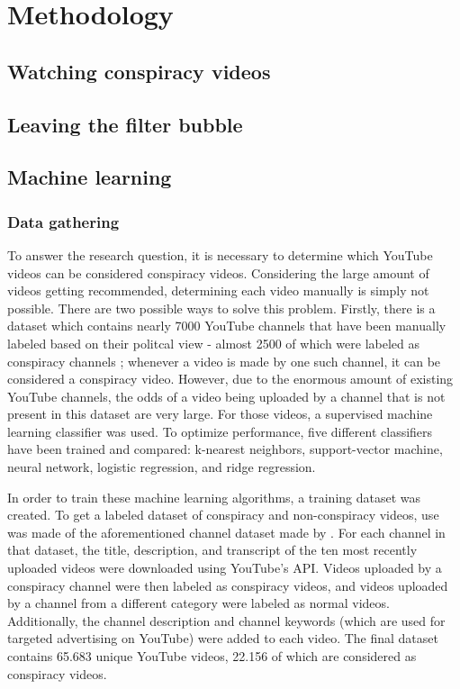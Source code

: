 \documentclass[../main.tex]{subfiles}
\begin{document}
\section{Methodology}
\subsection{Watching conspiracy videos}

\subsection{Leaving the filter bubble}

\subsection{Machine learning}
\subsubsection{Data gathering}
To answer the research question, it is necessary to determine which YouTube videos can be considered conspiracy videos. Considering the large amount of videos getting recommended, determining each video manually is simply not possible. There are two possible ways to solve this problem. Firstly, there is a dataset which contains nearly 7000 YouTube channels that have been manually labeled based on their politcal view - almost 2500 of which were labeled as conspiracy channels \citep{ledwich2019algorithmic}; whenever a video is made by one such channel, it can be considered a conspiracy video. However, due to the enormous amount of existing YouTube channels, the odds of a video being uploaded by a channel that is not present in this dataset are very large. For those videos, a supervised machine learning classifier was used. To optimize performance, five different classifiers have been trained and compared: k-nearest neighbors, support-vector machine, neural network, logistic regression, and ridge regression. 

In order to train these machine learning algorithms, a training dataset was created. To get a labeled dataset of conspiracy and non-conspiracy videos, use was made of the aforementioned channel dataset made by \citet{ledwich2019algorithmic}. For each channel in that dataset, the title, description, and transcript of the ten most recently uploaded videos were downloaded using YouTube's API. Videos uploaded by a conspiracy channel were then labeled as conspiracy videos, and videos uploaded by a channel from a different category were labeled as normal videos. Additionally, the channel description and channel keywords (which are used for targeted advertising on YouTube) were added to each video. The final dataset contains 65.683 unique YouTube videos, 22.156 of which are considered as conspiracy videos. 
\end{document}
